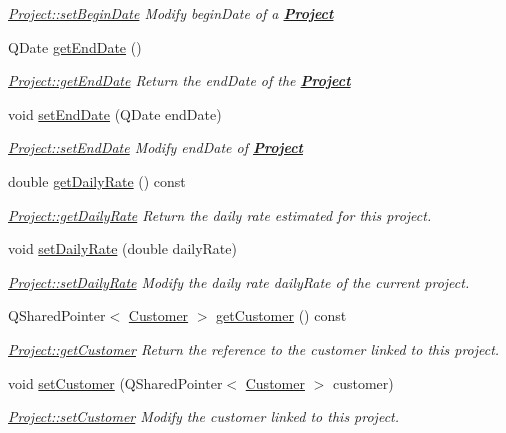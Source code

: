 \begin{DoxyCompactItemize}
\begin{DoxyCompactList}\small\item\em \hyperlink{classProject_afd187147978c58351d686b987d37306e}{Project\+::set\+Begin\+Date} Modify {\itshape begin\+Date} of a {\bfseries \hyperlink{classProject}{Project}} \end{DoxyCompactList}\item 
Q\+Date \hyperlink{classProject_a16fcc3fd33b63ef7cb53e1e766926393}{get\+End\+Date} ()
\begin{DoxyCompactList}\small\item\em \hyperlink{classProject_a16fcc3fd33b63ef7cb53e1e766926393}{Project\+::get\+End\+Date} Return the {\itshape end\+Date} of the {\bfseries \hyperlink{classProject}{Project}} \end{DoxyCompactList}\item 
void \hyperlink{classProject_a1f78db4ad8a366aa772d496a4735bc71}{set\+End\+Date} (Q\+Date end\+Date)
\begin{DoxyCompactList}\small\item\em \hyperlink{classProject_a1f78db4ad8a366aa772d496a4735bc71}{Project\+::set\+End\+Date} Modify {\itshape end\+Date} of {\bfseries \hyperlink{classProject}{Project}} \end{DoxyCompactList}\item 
double \hyperlink{classProject_a1f34916428682e0134675d45f93a2173}{get\+Daily\+Rate} () const 
\begin{DoxyCompactList}\small\item\em \hyperlink{classProject_a1f34916428682e0134675d45f93a2173}{Project\+::get\+Daily\+Rate} Return the daily rate estimated for this project. \end{DoxyCompactList}\item 
void \hyperlink{classProject_aa3c6dc9722ed16fd69a6034b2398a7c9}{set\+Daily\+Rate} (double daily\+Rate)
\begin{DoxyCompactList}\small\item\em \hyperlink{classProject_aa3c6dc9722ed16fd69a6034b2398a7c9}{Project\+::set\+Daily\+Rate} Modify the daily rate {\itshape daily\+Rate} of the current project. \end{DoxyCompactList}\item 
Q\+Shared\+Pointer$<$ \hyperlink{classCustomer}{Customer} $>$ \hyperlink{classProject_acdaa432748b195795867363acd7b378b}{get\+Customer} () const 
\begin{DoxyCompactList}\small\item\em \hyperlink{classProject_acdaa432748b195795867363acd7b378b}{Project\+::get\+Customer} Return the reference to the customer linked to this project. \end{DoxyCompactList}\item 
void \hyperlink{classProject_a578a5dac01297c5dd517147915346d85}{set\+Customer} (Q\+Shared\+Pointer$<$ \hyperlink{classCustomer}{Customer} $>$ customer)
\begin{DoxyCompactList}\small\item\em \hyperlink{classProject_a578a5dac01297c5dd517147915346d85}{Project\+::set\+Customer} Modify the {\itshape customer} linked to this project. \end{DoxyCompactList}\end{DoxyCompactItemize}
